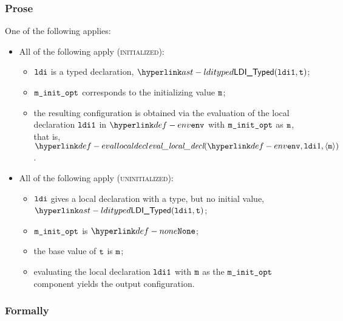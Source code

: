 \subsubsection{Prose}
One of the following applies:
\begin{itemize}
    \item All of the following apply (\textsc{initialized}):
    \begin{itemize}
        \item $\ldi$ is a typed declaration, $\LDITyped(\ldione, \vt)$;
        \item $\minitopt$ corresponds to the initializing value $\vm$;
        \item the resulting configuration is obtained via the evaluation
        of the local declaration $\ldione$ in $\env$ with $\minitopt$ as $\vm$,
        that is, \\ $\evallocaldecl{\env, \ldi1, \langle \vm\rangle}$.
    \end{itemize}

    \item All of the following apply (\textsc{uninitialized}):
    \begin{itemize}
      \item $\ldi$ gives a local declaration with a type, but no initial value, \\
            $\LDITyped(\ldione, \vt)$;
      \item $\minitopt$ is $\None$;
      \item the base value of $\vt$ is $\vm$\ProseOrError;
      \item evaluating the local declaration $\ldione$ with $\vm$
            as the $\minitopt$ component yields the output configuration.
    \end{itemize}
\end{itemize}
\subsubsection{Formally}
\begin{mathpar}
\end{mathpar}

\begin{mathpar}
\end{mathpar}

